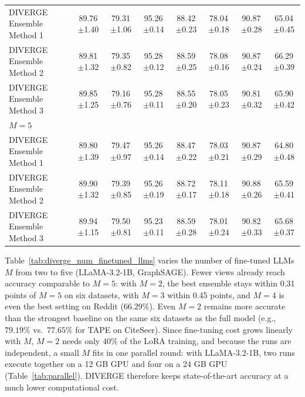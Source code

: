\documentclass[a4paper,fleqn]{cas-sc}
\DeclareRobustCommand{\revcommon}[2][]{\textcolor{revshared}{#2}} %
\begin{document}
\begin{table}[htbp]
\begin{tabular*}{\textwidth}{@{\extracolsep{\fill}} lccccccc @{}}
\midrule
DIVERGE Ensemble Method 1 & 89.76{\scriptsize$\pm$1.40} & 79.31{\scriptsize$\pm$1.06} & 95.26{\scriptsize$\pm$0.14} & 88.42{\scriptsize$\pm$0.23} & 78.04{\scriptsize$\pm$0.18} & 90.87{\scriptsize$\pm$0.28} & 65.04{\scriptsize$\pm$0.45} \\
DIVERGE Ensemble Method 2 & 89.81{\scriptsize$\pm$1.32} & 79.35{\scriptsize$\pm$0.82} & 95.28{\scriptsize$\pm$0.12} & 88.59{\scriptsize$\pm$0.25} & 78.08{\scriptsize$\pm$0.16} & 90.87{\scriptsize$\pm$0.24} & 66.29{\scriptsize$\pm$0.39} \\
DIVERGE Ensemble Method 3 & 89.85{\scriptsize$\pm$1.25} & 79.16{\scriptsize$\pm$0.76} & 95.28{\scriptsize$\pm$0.11} & 88.55{\scriptsize$\pm$0.20} & 78.05{\scriptsize$\pm$0.23} & 90.81{\scriptsize$\pm$0.32} & 65.90{\scriptsize$\pm$0.42} \\
\midrule
\multicolumn{8}{l}{\textit{$M=5$}} \\
\midrule
DIVERGE Ensemble Method 1 & 89.80{\scriptsize$\pm$1.39} & 79.47{\scriptsize$\pm$0.97} & 95.26{\scriptsize$\pm$0.14} & 88.47{\scriptsize$\pm$0.22} & 78.03{\scriptsize$\pm$0.21} & 90.87{\scriptsize$\pm$0.29} & 64.80{\scriptsize$\pm$0.48} \\
DIVERGE Ensemble Method 2 & 89.90{\scriptsize$\pm$1.32} & 79.39{\scriptsize$\pm$0.85} & 95.26{\scriptsize$\pm$0.19} & 88.72{\scriptsize$\pm$0.17} & 78.11{\scriptsize$\pm$0.18} & 90.88{\scriptsize$\pm$0.26} & 65.59{\scriptsize$\pm$0.41} \\
DIVERGE Ensemble Method 3 & 89.94{\scriptsize$\pm$1.15} & 79.50{\scriptsize$\pm$0.81} & 95.23{\scriptsize$\pm$0.11} & 88.59{\scriptsize$\pm$0.28} & 78.01{\scriptsize$\pm$0.24} & 90.82{\scriptsize$\pm$0.33} & 65.68{\scriptsize$\pm$0.37} \\
\bottomrule
\end{tabular*}
\end{table}

\revcommon[R1,R2,R4]{Table~\ref{tab:diverge_num_finetuned_llms} varies the number of fine-tuned LLMs $M$ from two to five (LLaMA-3.2-1B, GraphSAGE). Fewer views already reach accuracy comparable to $M=5$: with $M=2$, the best ensemble stays within 0.31 points of $M=5$ on six datasets, with $M=3$ within 0.45 points, and $M=4$ is even the best setting on Reddit ($66.29\%$). Even $M=2$ remains more accurate than the strongest baseline on the same six datasets as the full model (e.g., $79.19\%$ vs.\ $77.65\%$ for TAPE on CiteSeer). Since fine-tuning cost grows linearly with $M$, $M=2$ needs only $40\%$ of the LoRA training, and because the runs are independent, a small $M$ fits in one parallel round: with LLaMA-3.2-1B, two runs execute together on a 12 GB GPU and four on a 24 GB GPU (Table~\ref{tab:parallel}). DIVERGE therefore keeps state-of-the-art accuracy at a much lower computational cost.}
\end{document}
